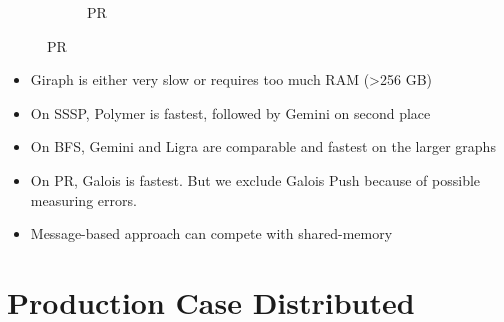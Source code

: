 \documentclass{meetings}
\begin{document}
\begin{figure}[h]
\begin{subfigure}{0.32\textwidth}
		\caption{PR}
	\end{subfigure}
\end{figure}
\begin{itemize}
	\item Giraph is either very slow or requires too much RAM (>256 GB)
	\item On SSSP, Polymer is fastest, followed by Gemini on second place
	\item On BFS, Gemini and Ligra are comparable and fastest on the larger graphs
	\item On PR, Galois is fastest. But we exclude Galois Push because of possible measuring errors.
	\item Message-based approach can compete with shared-memory
\end{itemize}

\clearpage
\section{Production Case Distributed}
\end{document}
